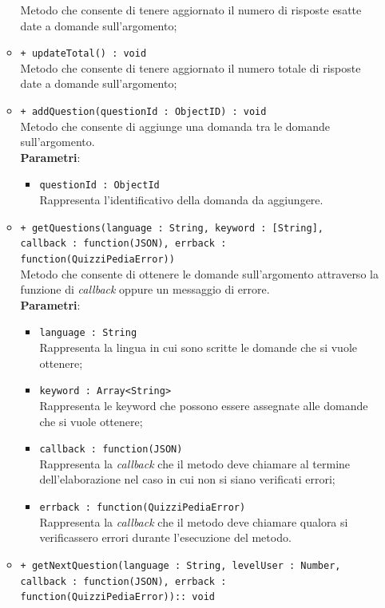 \begin{itemize}
\begin{itemize}
			Metodo che consente di tenere aggiornato il numero di risposte esatte date a domande sull'argomento;
			\item \texttt{+ updateTotal() : void} \\
			Metodo che consente di tenere aggiornato il numero totale di risposte date a domande sull'argomento;
			\item \texttt{+ addQuestion(questionId : ObjectID) : void} \\
			Metodo che consente di aggiunge una domanda tra le domande sull'argomento. \\
			\textbf{Parametri}:
			\begin{itemize}
			\item \texttt{questionId : ObjectId} \\
			Rappresenta l'identificativo della domanda da aggiungere.
			\end{itemize}
			\item \texttt{+ getQuestions(language : String, keyword : [String], \\callback : function(JSON), errback : function(QuizziPediaError))} \\
			Metodo che consente di ottenere le domande sull'argomento attraverso la funzione di \textit{callback} oppure un messaggio di errore. \\
			\textbf{Parametri}:
			\begin{itemize}
			\item \texttt{language : String} \\
			Rappresenta la lingua in cui sono scritte le domande che si vuole ottenere;
			\item \texttt{keyword : Array<String>} \\
			Rappresenta le keyword che possono essere assegnate alle domande che si vuole ottenere;
			\item \texttt{callback : function(JSON)} \\
			Rappresenta la \textit{callback} che il metodo deve chiamare al termine dell'elaborazione nel caso in cui non si siano verificati errori;
			\item \texttt{errback : function(QuizziPediaError)} \\
			Rappresenta la \textit{callback} che il metodo deve chiamare qualora si verificassero errori durante l'esecuzione del metodo.
			\end{itemize}
			\item \texttt{+ getNextQuestion(language : String, levelUser : Number, \\callback : function(JSON), errback : function(QuizziPediaError)):: void} \\

\end{itemize}
\end{itemize}

